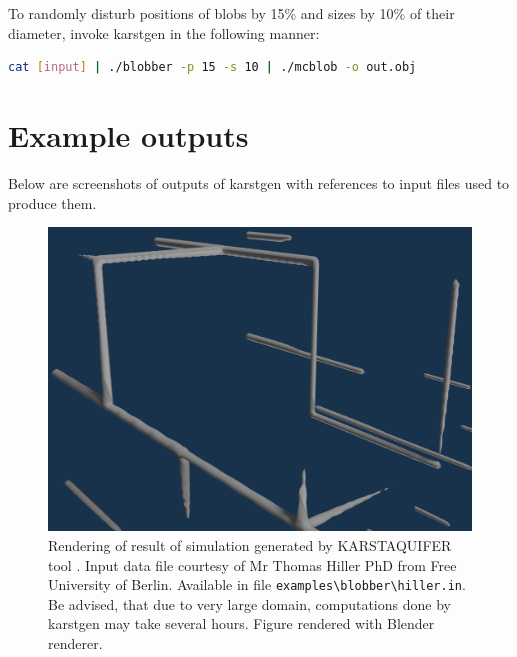 To randomly disturb positions of blobs by 15\% and sizes by 10\% of their
diameter, invoke karstgen in the following manner:
\begin{lstlisting}[language=bash,numbers=none]
cat [input] | ./blobber -p 15 -s 10 | ./mcblob -o out.obj
\end{lstlisting}

\section{Example outputs}
Below are screenshots of outputs of karstgen with references to input files used
to produce them.

\begin{figure}[htb]
  \begin{center}
    \includegraphics[width=\textwidth]{chapters/project/hiller_result.png}
  \end{center}
  \caption{Rendering of result of simulation generated by KARSTAQUIFER tool \parencite{Kaufmann200962}.
  Input data file courtesy of Mr Thomas Hiller PhD from Free University of Berlin.
  Available in file \texttt{examples\textbackslash blobber\textbackslash hiller.in}. Be advised, that
  due to very large domain, computations done by karstgen may take several hours.
  Figure rendered with Blender renderer.}
  \label{fig:hillershot}
\end{figure}

